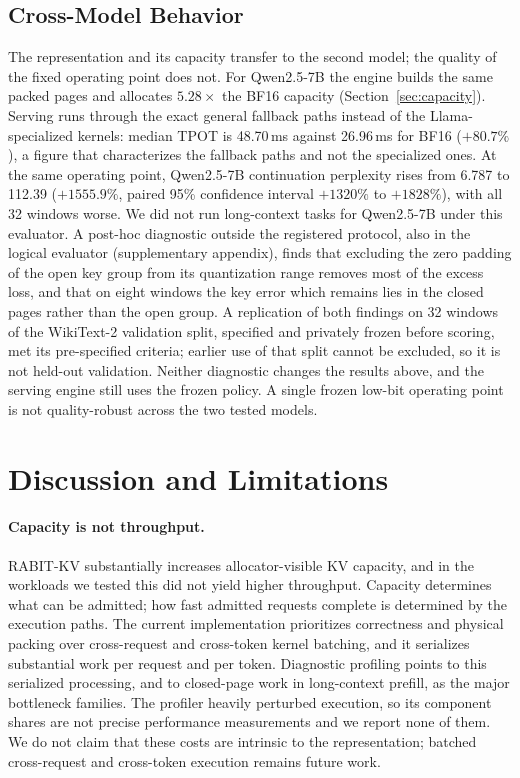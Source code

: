 \documentclass{article}
\begin{document}
\subsection{Cross-Model Behavior}
\label{sec:crossmodel}

The representation and its capacity transfer to the second model; the quality of the fixed operating
point does not. For Qwen2.5-7B the engine builds the same packed pages and allocates $5.28\times$ the
BF16 capacity (Section~\ref{sec:capacity}). Serving runs through the exact general fallback paths
instead of the Llama-specialized kernels: median TPOT is 48.70\,ms against 26.96\,ms for BF16
($+80.7\%$), a figure that characterizes the fallback paths and not the specialized ones. At the same
operating point, Qwen2.5-7B continuation perplexity rises from 6.787 to 112.39 ($+1555.9\%$, paired 95\%
confidence interval $+1320\%$ to $+1828\%$), with all 32 windows worse. We did not run long-context
tasks for Qwen2.5-7B under this evaluator. A post-hoc diagnostic outside the registered protocol, also in
the logical evaluator (supplementary appendix), finds that excluding the zero padding of the open key group
from its quantization range removes most of the excess loss, and that on eight windows the key error which
remains lies in the closed pages rather than the open group. A replication of both findings on 32 windows
of the WikiText-2 validation split, specified and privately frozen before scoring, met its pre-specified
criteria; earlier use of that split cannot be excluded, so it is not held-out validation. Neither
diagnostic changes the results above, and the serving engine still uses the frozen policy. A single
frozen low-bit operating point is not quality-robust across the two tested models.

\section{Discussion and Limitations}
\label{sec:discussion}

\paragraph{Capacity is not throughput.}
RABIT-KV substantially increases allocator-visible KV capacity, and in the workloads we tested this
did not yield higher throughput. Capacity determines what can be admitted; how fast admitted requests
complete is determined by the execution paths. The current implementation prioritizes correctness and
physical packing over cross-request and cross-token kernel batching, and it serializes substantial
work per request and per token. Diagnostic profiling points to this serialized processing, and to
closed-page work in long-context prefill, as the major bottleneck families. The profiler heavily
perturbed execution, so its component shares are not precise performance measurements and we report
none of them. We do not claim that these costs are intrinsic to the representation; batched
cross-request and cross-token execution remains future work.
\end{document}
